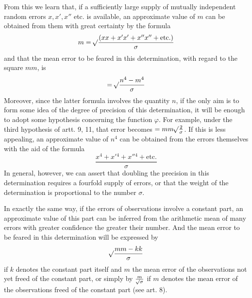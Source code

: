 From this we learn that, if a sufficiently large supply of mutually independent random errors \(x,x',x''\) etc. is available, an approximate value of \(m\) can be obtained from them with great certainty by the formula
\[
m=\mathord{{}^{}\!\surd}\frac{(xx+x'x'+x''x''+\text{etc.})}{\sigma}
\]
and that the mean error to be feared in this determination, with regard to the square \(mm\), is
\[
=\mathord{{}^{}\!\surd}\frac{n^4-m^4}{\sigma}
\]
Moreover, since the latter formula involves the quantity \(n\), if the only aim is to form some idea of the degree of precision of this determination, it will be enough to adopt some hypothesis concerning the function \(\varphi\). For example, under the third hypothesis of artt. 9, 11, that error becomes \(=mm\mathord{{}^{}\!\surd}\frac2\sigma\). If this is less appealing, an approximate value of \(n^4\) can be obtained from the errors themselves with the aid of the formula
\[
\frac{x^4+x'{}^4+x''{}^4+\text{etc.}}{\sigma}
\]
In general, however, we can assert that doubling the precision in this determination requires a fourfold supply of errors, or that the weight of the determination is proportional to the number \(\sigma\).

In exactly the same way, if the errors of observations involve a constant part, an approximate value of this part can be inferred from the arithmetic mean of many errors with greater confidence the greater their number. And the mean error to be feared in this determination will be expressed by
\[
\mathord{{}^{}\!\surd}\frac{mm-kk}{\sigma}
\]
if \(k\) denotes the constant part itself and \(m\) the mean error of the observations not yet freed of the constant part, or simply by \(\frac{m}{\mathord{{}^{}\!\surd}\sigma}\) if \(m\) denotes the mean error of the observations freed of the constant part (see art. 8).

\clearpage
